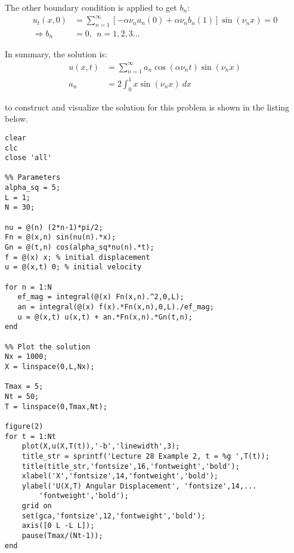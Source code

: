 \vspace{0.25cm}

\noindent The other boundary condition is applied to get $b_n$:
\begin{align*}
u_t(x,0) &= \sum\limits_{n=1}^{\infty} \left[-\alpha \nu_n a_n (0) + \alpha \nu_n b_n(1)\right]\sin{(\nu_n x)} = 0 \\
\Rightarrow b_n &= 0, \ \ n=1,2,3\dots
\end{align*}

\noindent In summary, the solution is:
\begin{align*}
u(x,t) &= \sum\limits_{n=1}^{\infty} a_n \cos{(\alpha \nu_n t)}\sin{(\nu_n x)} \\
a_n &= 2 \int_0^1 x \sin{(\nu_n x)} \ dx
\end{align*}

 to construct and visualize the solution for this problem is shown in the listing below.

\begin{lstlisting}[name=lec28-ex2, style=myMatlab]
clear
clc
close 'all'

%% Parameters
alpha_sq = 5;
L = 1;
N = 30;

nu = @(n) (2*n-1)*pi/2;
Fn = @(x,n) sin(nu(n).*x);
Gn = @(t,n) cos(alpha_sq*nu(n).*t);
f = @(x) x; % initial displacement
u = @(x,t) 0; % initial velocity

for n = 1:N
   ef_mag = integral(@(x) Fn(x,n).^2,0,L);
   an = integral(@(x) f(x).*Fn(x,n),0,L)./ef_mag;   
   u = @(x,t) u(x,t) + an.*Fn(x,n).*Gn(t,n);
end

%% Plot the solution
Nx = 1000;
X = linspace(0,L,Nx);

Tmax = 5;
Nt = 50;
T = linspace(0,Tmax,Nt);

figure(2)
for t = 1:Nt
    plot(X,u(X,T(t)),'-b','linewidth',3);
    title_str = sprintf('Lecture 28 Example 2, t = %g ',T(t));
    title(title_str,'fontsize',16,'fontweight','bold');
    xlabel('X','fontsize',14,'fontweight','bold');
    ylabel('U(X,T) Angular Displacement', 'fontsize',14,...
        'fontweight','bold');
    grid on
    set(gca,'fontsize',12,'fontweight','bold');
    axis([0 L -L L]);
    pause(Tmax/(Nt-1));    
end
\end{lstlisting}

